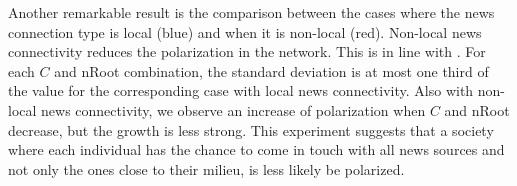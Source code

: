 Another remarkable result is the comparison between the cases where the news connection type is local (blue) and when it is non-local (red). Non-local news connectivity reduces the polarization in the network. This is in line with \cite{Lee2014a}.
For each $C$ and nRoot combination, the standard deviation is at most one third of the value for the corresponding case with local news connectivity. Also with non-local news connectivity, we observe an increase of polarization when $C$ and nRoot decrease, but the growth is less strong. This experiment suggests that a society where each individual has the chance to come in touch with all news sources and not only the ones close to their milieu, is less likely be polarized.

